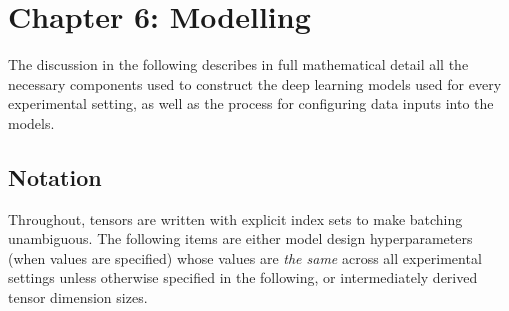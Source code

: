\documentclass[stu,floatsintext]{apa7}
\begin{document}
\clearpage
\section{Chapter 6: Modelling}

The discussion in the following describes in full mathematical detail all the necessary components used to construct the deep learning models used for every experimental setting, as well as the process for configuring data inputs into the models.

\subsection{Notation}

Throughout, tensors are written with explicit index sets to make batching unambiguous. The following items are either model design hyperparameters (when values are specified) whose values are \textit{the same} across all experimental settings unless otherwise specified in the following, or intermediately derived tensor dimension sizes.
\end{document}
